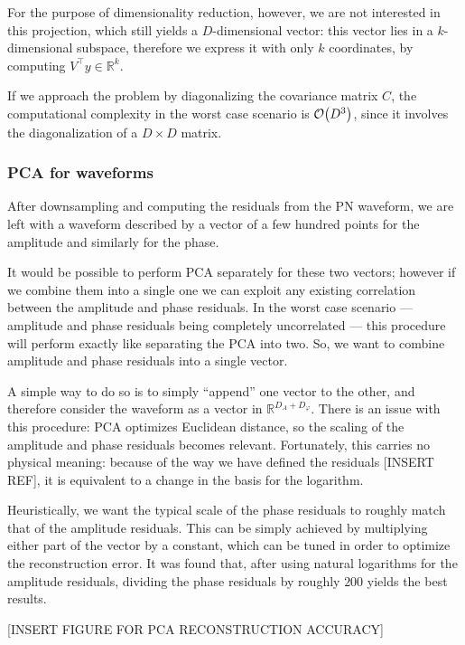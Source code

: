 \documentclass[main.tex]{subfiles}
\begin{document}
For the purpose of dimensionality reduction, however, we are not interested in this projection, which still yields a \(D\)-dimensional vector: this vector lies in a \(k\)-dimensional subspace, therefore we  express it with only \(k\) coordinates, by computing \(V^{\top} y \in \mathbb{R}^{k}\). 


If we approach the problem by diagonalizing the covariance matrix \(C\), the computational complexity in the worst case scenario is \(\order{D^3}\), since it involves the diagonalization of a \(D \times D\) matrix.

\subsubsection{PCA for waveforms}

After downsampling and computing the residuals from the \ac{PN} waveform, we are left with a waveform described by a vector of a few hundred points for the amplitude and similarly for the phase. 

It would be possible to perform \ac{PCA} separately for these two vectors; however if we combine them into a single one we can exploit any existing correlation between the amplitude and phase residuals. 
In the worst case scenario --- amplitude and phase residuals being completely uncorrelated --- this procedure will perform exactly like separating the \ac{PCA} into two. 
So, we want to combine amplitude and phase residuals into a single vector. 

A simple way to do so is to simply ``append'' one vector to the other, and therefore consider the waveform as a vector in \(\mathbb{R}^{D_A + D_\varphi }\). 
There is an issue with this procedure: \ac{PCA} optimizes Euclidean distance, so the scaling of the amplitude and phase residuals becomes relevant. 
Fortunately, this carries no physical meaning: because of the way we have defined the residuals [INSERT REF], it is equivalent to a change in the basis for the logarithm. 

Heuristically, we want the typical scale of the phase residuals to roughly match that of the amplitude residuals. 
This can be simply achieved by multiplying either part of the vector by a constant, which can be tuned in order to optimize the reconstruction error. 
It was found that, after using natural logarithms for the amplitude residuals, dividing the phase residuals by roughly \(200\) yields the best results.

[INSERT FIGURE FOR PCA RECONSTRUCTION ACCURACY]
\end{document}
